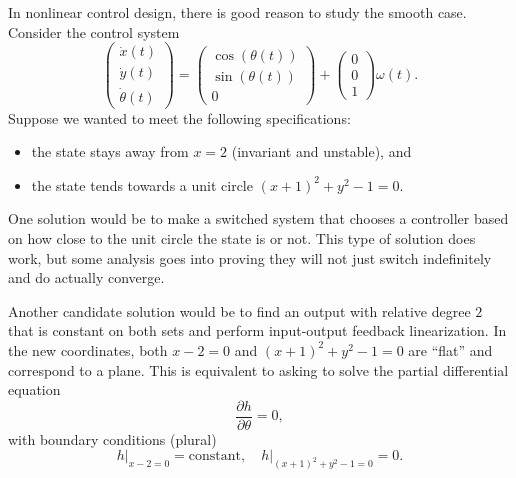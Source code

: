In nonlinear control design, there is good reason to study the smooth case.
Consider the control system
\[
  \begin{pmatrix} \dot{x}(t) \\ \dot{y}(t) \\ \dot{\theta}(t) \end{pmatrix}
    =
    \begin{pmatrix}
      \cos(\theta(t))\\ \sin(\theta(t))\\ 0
    \end{pmatrix}
    +
    \begin{pmatrix} 0 \\ 0 \\ 1 \end{pmatrix} \omega(t).
\]
Suppose we wanted to meet the following specifications:
\begin{itemize}
  \item{
    the state stays away from \(x = 2\) (invariant and unstable), and
  }
  \item{
    the state tends towards a unit circle \((x+1)^2 + y^2 - 1 = 0.\)
  }
\end{itemize}
One solution would be to make a switched system that chooses a controller based on how close to the unit circle the state is or not.
This type of solution does work, but some analysis goes into proving they will not just switch indefinitely and do actually converge.

Another candidate solution would be to find an output with relative degree \(2\) that is constant on both sets and perform input-output feedback linearization.
In the new coordinates, both \(x - 2 = 0\) and \((x+1)^2 + y^2 - 1 = 0\) are ``flat'' and correspond to a plane.
This is equivalent to asking to solve the partial differential equation
\[
  \frac{\partial h}{\partial \theta} = 0,
\]
with boundary conditions (plural)
\[
  \left. h \right|_{x - 2 = 0} = \text{constant}, \quad \left. h \right|_{(x+1)^2 + y^2 - 1 = 0} = 0. 
\]

